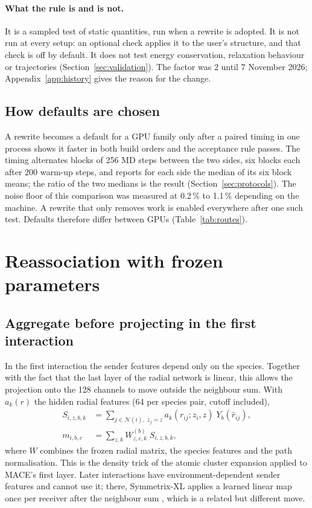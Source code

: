 \documentclass[11pt]{article}
\begin{document}
\paragraph{What the rule is and is not.}
It is a sampled test of static quantities, run when a rewrite is adopted. It is not run at every setup: an
optional check applies it to the user's structure, and that check is off by default. It does not test energy
conservation, relaxation behaviour or trajectories (Section~\ref{sec:validation}). The factor was 2 until
7 November 2026; Appendix~\ref{app:history} gives the reason for the change.

\subsection{How defaults are chosen}

A rewrite becomes a default for a GPU family only after a paired timing in one process shows it faster in both
build orders and the acceptance rule passes. The timing alternates blocks of 256 MD steps between the two sides,
six blocks each after 200 warm-up steps, and reports for each side the median of its six block means; the ratio
of the two medians is the result (Section~\ref{sec:protocols}). The noise floor of this comparison was measured
at 0.2\,\% to 1.1\,\% depending on the machine. A rewrite that only removes work is enabled everywhere after one
such test. Defaults therefore differ between GPUs (Table~\ref{tab:routes}).

\section{Reassociation with frozen parameters}
\label{sec:reassoc}

\subsection{Aggregate before projecting in the first interaction}
\label{sec:first}

In the first interaction the sender features depend only on the species. Together with the fact that the last
layer of the radial network is linear, this allows the projection onto the 128 channels to move outside the
neighbour sum. With $a_k(r)$ the hidden radial features (64 per species pair, cutoff included),
\begin{align}
S_{i,z,b,k} &= \sum_{j\in\mathcal N(i),\; z_j = z} a_k(r_{ij};z_i,z)\; Y_b(\hat r_{ij}), \\
m_{i,b,c}   &= \sum_{z,k} W^{(b)}_{z,c,k}\; S_{i,z,b,k},
\end{align}
where $W$ combines the frozen radial matrix, the species features and the path normalisation. This is the density
trick of the atomic cluster expansion \cite{drautz2019ace} applied to MACE's first layer. Later interactions have
environment-dependent sender features and cannot use it; there, Symmetrix-XL applies a learned linear map once
per receiver after the neighbour sum \cite{fu2026symmetrixxl}, which is a related but different move.
\end{document}
